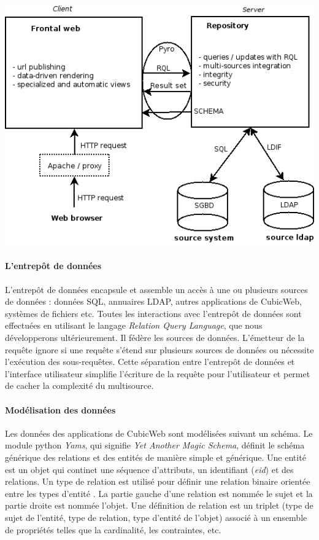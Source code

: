 \documentclass {report}
\begin{document}
\begin{center}
\includegraphics[scale=0.7]{archi_globale.png}
\end{center}

\paragraph{L'entrepôt de données}
L'entrepôt de données encapsule et assemble un accès à une ou plusieurs sources de données : données SQL, annuaires LDAP, autres applications de CubicWeb, systèmes de fichiers etc. Toutes les interactions avec l'entrepôt de données sont effectuées en utilisant le langage \textit{Relation Query Language}, que nous développerons ultérieurement. Il fédère les sources de données. L'émetteur de la requête ignore si une requête s'étend sur plusieurs sources de données ou nécessite l'exécution des sous-requêtes. Cette séparation entre l'entrepôt de données et l'interface utilisateur simplifie l'écriture de la requête pour l'utilisateur et permet de cacher la complexité du multisource.

\paragraph{Modélisation des données}
Les données des applications de CubicWeb sont modélisées suivant un schéma. Le module python \textit{Yams}, qui signifie \textit{Yet Another Magic Schema}, définit le schéma générique des relations et des entités de manière simple et générique. Une entité est un objet qui continet une séquence d'attributs, un identifiant (\textit{eid}) et des relations. Un type de relation est utilisé pour définir une relation binaire orientée entre les types d'entité . La partie gauche d'une relation est nommée le sujet et la partie droite est nommée l'objet. Une définition de relation est un triplet (type de sujet de l'entité, type de relation, type d'entité de l'objet) associé à un ensemble de propriétés telles que la cardinalité, les contraintes, etc.
\end{document}
